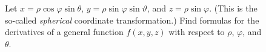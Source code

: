 \documentclass[12pt]{exam}
\theoremstyle{definition}
\begin{document}
\begin{questions}

\begin{figure}[ht]
\begin{minipage}[t]{0.7\linewidth}
\question Let $x = \rho \cos \varphi \sin \theta$, $y = \rho \sin \varphi \sin \vartheta$, and $z = \rho \sin \varphi$. (This is the so-called \emph{spherical} coordinate transformation.) Find formulas for the derivatives of a general function $f(x, y, z)$ with respect to $\rho$, $\varphi$, and $\theta$. 
\end{minipage} \hspace*{1cm}
\begin{minipage}[t]{0.25\linewidth}
\hfill
\end{minipage}
\end{figure}


\end{questions} 
\end{document}
